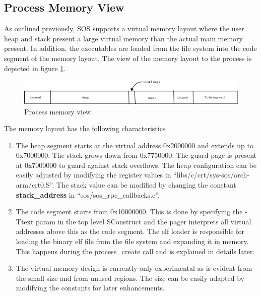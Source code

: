 \documentclass[a4paper, 11pt]{article}
\begin{document}
\subsection{Process Memory View}
As outlined previously, SOS supports a virtual memory layout where the
user heap and stack present a large virtual memory than the actual
main memory present. In addition, the executables are loaded from the
file system into the code segment of the memory layout. The view of
the memory layout to the process is depicted in figure
\ref{process-memory-fig}.
\begin{figure}
\begin{center}
\includegraphics[scale=0.4]{memory-layout.png}
\end{center}
\caption{Process memory view}
\label{process-memory-fig}
\end{figure}
The memory layout has the following characteristics
\begin{enumerate}
\item The heap segment starts at the virtual address 0x2000000 and
  extends up to 0x7000000. The stack grows down from 0x7750000. The
  guard page is present at 0x7000000 to guard against stack overflows.
  The heap configuration can be easily adjusted by modifying the
  register values in ``libs/c/crt/sys-sos/arch-arm/crt0.S''. The stack
  value can be modified by changing the constant {\bf stack\_address}
  in ``sos/sos\_rpc\_callbacks.c''.
\item The code segment starts from 0x10000000. This is done by specifying
  the -Ttext param in the top level SConstruct and the pager
  interprets all virtual addresses above this as the code segment. The
  elf loader is responsible for loading the binary elf file from the
  file system and expanding it in memory. This happens during the
  process\_create call and is explained in details later.
\item The virtual memory design is currently only experimental as is
  evident from the small size and from unused regions. The size can be
  easily adapted by modifying the constants for later enhancements.
\end{enumerate}
\end{document}
